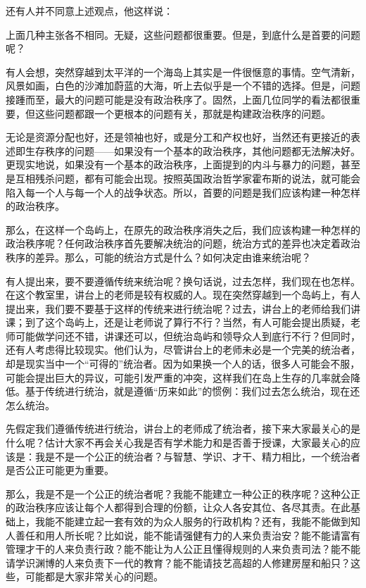还有人并不同意上述观点，他这样说：


上面几种主张各不相同。无疑，这些问题都很重要。但是，到底什么是首要的问题呢？

有人会想，突然穿越到太平洋的一个海岛上其实是一件很惬意的事情。空气清新，风景如画，白色的沙滩加蔚蓝的大海，听上去似乎是一个不错的选择。但是，问题接踵而至，最大的问题可能是没有政治秩序了。固然，上面几位同学的看法都很重要，但这些问题都跟一个更根本的问题有关，那就是构建政治秩序的问题。

无论是资源分配也好，还是领袖也好，或是分工和产权也好，当然还有更接近的表述即生存秩序的问题——如果没有一个基本的政治秩序，其他问题都无法解决好。更现实地说，如果没有一个基本的政治秩序，上面提到的内斗与暴力的问题，甚至是互相残杀问题，都有可能会出现。按照英国政治哲学家霍布斯的说法，就可能会陷入每一个人与每一个人的战争状态。所以，首要的问题是我们应该构建一种怎样的政治秩序。

那么，在这样一个岛屿上，在原先的政治秩序消失之后，我们应该构建一种怎样的政治秩序呢？任何政治秩序首先要解决统治的问题，统治方式的差异也决定着政治秩序的差异。那么，可能的统治方式是什么？如何决定由谁来统治呢？

有人提出来，要不要遵循传统来统治呢？换句话说，过去怎样，我们现在也怎样。在这个教室里，讲台上的老师是较有权威的人。现在突然穿越到一个岛屿上，有人提出来，我们要不要基于这样的传统来进行统治呢？过去，讲台上的老师给我们讲课；到了这个岛屿上，还是让老师说了算行不行？当然，有人可能会提出质疑，老师可能做学问还不错，讲课还可以，但统治岛屿和领导众人到底行不行？但同时，还有人考虑得比较现实。他们认为，尽管讲台上的老师未必是一个完美的统治者，却是现实当中一个“可得的”统治者。因为如果换一个人的话，很多人可能会不服，可能会提出巨大的异议，可能引发严重的冲突，这样我们在岛上生存的几率就会降低。基于传统进行统治，就是遵循“历来如此”的惯例：我们过去怎么统治，现在还怎么统治。

先假定我们遵循传统进行统治，讲台上的老师成了统治者，接下来大家最关心的是什么呢？估计大家不再会关心我是否有学术能力和是否善于授课，大家最关心的应该是：我是不是一个公正的统治者？与智慧、学识、才干、精力相比，一个统治者是否公正可能更为重要。

那么，我是不是一个公正的统治者呢？我能不能建立一种公正的秩序呢？这种公正的政治秩序应该让每个人都得到合理的份额，让众人各安其位、各尽其责。在此基础上，我能不能建立起一套有效的为众人服务的行政机构？还有，我能不能做到知人善任和用人所长呢？比如说，能不能请强健有力的人来负责治安？能不能请富有管理才干的人来负责行政？能不能让为人公正且懂得规则的人来负责司法？能不能请学识渊博的人来负责下一代的教育？能不能请技艺高超的人修建房屋和船只？这些，可能都是大家非常关心的问题。

